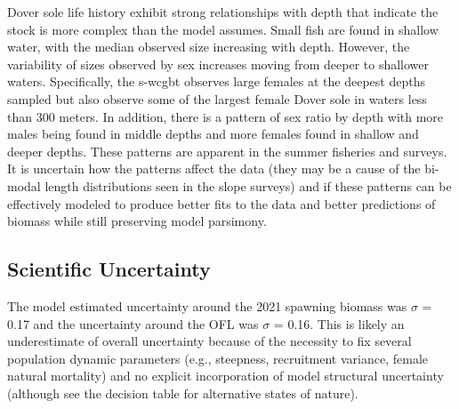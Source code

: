 \documentclass[11pt,
  english,
  a4paper,
]{article}
\begin{document}
\leavevmode\tagmcend\tagstructend\par


Dover sole life history exhibit strong relationships with depth that indicate the stock is more complex than the model assumes. Small fish are found in shallow water, with the median observed size increasing with depth. However, the variability of sizes observed by sex increases moving from deeper to shallower waters. Specifically, the \gls{s-wcgbt} observes large females at the deepest depths sampled but also observe some of the largest female Dover sole in waters less than 300 meters. In addition, there is a pattern of sex ratio by depth with more males being found in middle depths and more females found in shallow and deeper depths. These patterns are apparent in the summer fisheries and surveys. It is uncertain how the patterns affect the data (they may be a cause of the bi-modal length distributions seen in the slope surveys) and if these patterns can be effectively modeled to produce better fits to the data and better predictions of biomass while still preserving model parsimony.

\leavevmode\tagmcend\tagstructend\par


\hypertarget{scientific-uncertainty}{%
\subsection*{Scientific Uncertainty}\label{scientific-uncertainty}}

\leavevmode\tagmcend\tagstructend


The model estimated uncertainty around the 2021 spawning biomass was {\(\sigma\)\leavevmode\tagmcend\tagstructend} = 0.17 and the uncertainty around the OFL was {\(\sigma\)\leavevmode\tagmcend\tagstructend} = 0.16. This is likely an underestimate of overall uncertainty because of the necessity to fix several population dynamic parameters (e.g., steepness, recruitment variance, female natural mortality) and no explicit incorporation of model structural uncertainty (although see the decision table for alternative states of nature).
\end{document}
